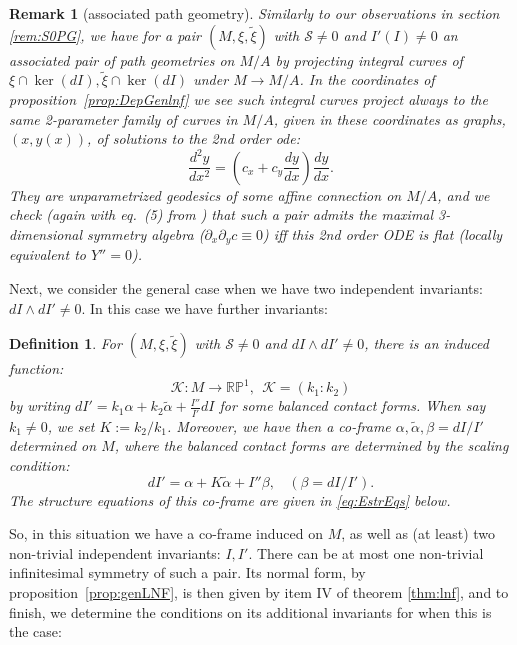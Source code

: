 \documentclass[10pt]{amsart}
\newcommand{\del}{\partial}
\theoremstyle{definition}
\newtheorem{dfn}{Definition}
\newtheorem{rem}{Remark}
\begin{document}
\begin{rem}[associated path geometry]\label{rem:DepPG}
    {\em Similarly to our observations in section \ref{rem:S0PG}, we have for a pair $(M, \xi, \tilde \xi)$ with $\mathcal{S}\ne 0$ and $I'(I)\ne 0$ an associated pair of path geometries on $M/A$ by projecting integral curves of $\xi\cap \ker (dI), \tilde \xi\cap \ker(dI)$ under $M\to M/A$. In the coordinates of proposition~\ref{prop:DepGenlnf} we see such integral curves project always to the {\em same} 2-parameter family of curves in $M/A$, given in these coordinates as graphs, $(x, y(x))$, of solutions to the 2nd order ode:
    \[ \frac{d^2y}{dx^2} = \left( c_x + c_y \frac{dy}{dx} \right)\frac{dy}{dx}. \]
    They are unparametrized geodesics of some affine connection on $M/A$, and we check (again with eq.~(5) from \cite{BGH}) that such a pair admits the maximal 3-dimensional symmetry algebra ($\del_x\del_y c \equiv 0$) iff this 2nd order ODE is {\em flat} (locally equivalent to $Y'' = 0$).}
\end{rem}

Next, we consider the general case when we have two independent invariants: $dI\wedge dI'\ne 0$. In this case we have further invariants:
\begin{dfn}\label{def:EStrInvs}
    {\em For $(M, \xi, \tilde \xi)$ with $\mathcal{S}\ne 0$ and $dI\wedge dI'\ne 0$, there is an induced function:
    \[ \mathcal{K}: M\to \mathbb{RP}^1, ~~\mathcal{K} = (k_1: k_2)\]
    by writing $dI' = k_1\alpha + k_2\tilde\alpha + \frac{I''}{I'}dI$ for some balanced contact forms. When say $k_1\ne 0$, we set $K:= k_2/k_1$. Moreover, we have then a co-frame $\alpha, \tilde\alpha, \beta = dI/I'$ determined on $M$, where the balanced contact forms are determined by the scaling condition:
    \[ dI' = \alpha + K\tilde\alpha + I''\beta, ~~~~(\beta = dI/I'). \]
    The structure equations of this co-frame are given in \eqref{eq:EstrEqs} below.}
\end{dfn}

So, in this situation we have a co-frame induced on $M$, as well as (at least) two non-trivial independent invariants: $I, I'$. There can be at most one non-trivial infinitesimal symmetry of such a pair. Its normal form, by proposition~\ref{prop:genLNF}, is then given by item IV of theorem \ref{thm:lnf}, and to finish, we determine the conditions on its additional invariants for when this is the case:
\end{document}
